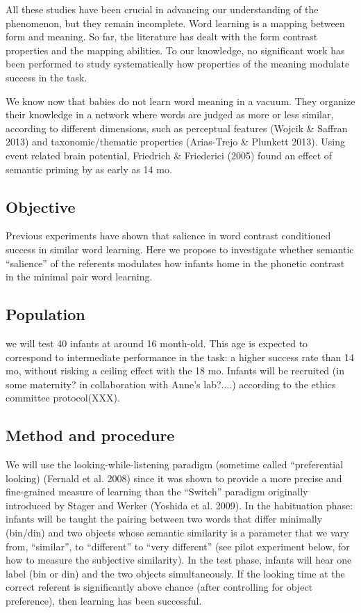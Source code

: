 \documentclass[12pt]{article}
\begin{document}
All these studies have been crucial in advancing our understanding of the phenomenon, but they remain incomplete. Word learning is a mapping between form and meaning. So far, the literature has dealt with the form contrast properties and the mapping abilities. To our knowledge, no significant work has been performed to study systematically how properties of the meaning modulate success in the task. 

We know now that babies do not learn word meaning in a vacuum. They organize their knowledge in a network where words are judged as more or less similar, according to different dimensions, such as perceptual features (Wojcik \& Saffran 2013) and taxonomic/thematic properties (Arias-Trejo \& Plunkett 2013). Using event related brain potential, Friedrich \& Friederici (2005) found an effect of semantic priming by as early as 14 mo.

\subsection*{Objective}
Previous experiments have shown that salience in word contrast conditioned success in similar word learning.  Here we propose to investigate whether semantic “salience” of the referents modulates how infants home in the phonetic contrast in the minimal pair word learning. 

\subsection*{Population}
we will test 40 infants at around 16 month-old. This age is expected to correspond to intermediate performance in the task: a higher success rate than 14 mo, without risking a ceiling effect with the 18 mo. Infants will be recruited (in some maternity? in collaboration with Anne’s lab?....) according to the ethics committee protocol(XXX). 

\subsection*{Method and procedure}
We will use the looking-while-listening paradigm (sometime called “preferential looking) (Fernald et al. 2008) since it was shown to provide a more precise and fine-grained measure of learning than the “Switch” paradigm originally introduced by Stager and Werker (Yoshida et al. 2009). In the habituation phase: infants will be taught the pairing between two words that differ minimally (bin/din) and two objects whose semantic similarity is a parameter that we vary from, “similar”, to “different” to “very different” (see pilot experiment below, for how to measure the subjective similarity). In the test phase, infants will hear one label (bin or din) and the two objects simultaneously. If the looking time at the correct referent is significantly above chance (after controlling for object preference), then learning has been successful. 
\end{document}
